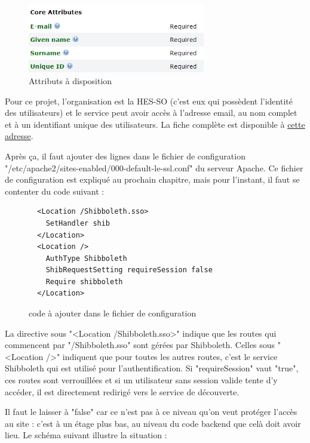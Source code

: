 \documentclass[
    iai, %
    eai, %
]{heig-tb}
\begin{document}
\begin{figure}[h]
  \centering
  \includegraphics[height=3cm]{registry2.PNG}
  \caption{Attributs à disposition}
\end{figure}

Pour ce projet, l'organisation est la HES-SO (c'est eux qui possèdent l'identité des utilisateurs) et le service peut avoir accès à l'adresse email, au nom complet et à un identifiant unique des utilisateurs. La fiche complète est disponible à \href{https://rr.aai.switch.ch/view_resource.php?resource=11600}{cette adresse}.

Après ça, il faut ajouter des lignes dans le fichier de configuration "/etc/apache2/sites-enabled/000-default-le-ssl.conf" du serveur Apache. Ce fichier de configuration est expliqué au prochain chapitre, mais pour l'instant, il faut se contenter du code suivant :

\begin{figure}[h]
  \begin{verbatim}
  <Location /Shibboleth.sso>
    SetHandler shib
  </Location>
  <Location />
    AuthType Shibboleth
    ShibRequestSetting requireSession false
    Require shibboleth
  </Location>
  \end{verbatim}
  \caption{code à ajouter dans le fichier de configuration}
  \label{code:Location}
\end{figure}

\newpage
La directive sous "<Location /Shibboleth.sso>" indique que les routes qui commencent par "/Shibboleth.sso" sont gérées par Shibboleth.
Celles sous "<Location />" indiquent que pour toutes les autres routes, c'est le service Shibboleth qui est utilisé pour l'authentification. Si "requireSession" vaut "true", ces routes sont verrouillées et si un utilisateur sans session valide tente d'y accéder, il est directement redirigé vers le service de découverte.

Il faut le laisser à "false" car ce n'est pas à ce niveau qu'on veut protéger l'accès au site : c'est à un étage plus bas, au niveau du code backend que celà doit avoir lieu.
Le schéma suivant illustre la situation :

\end{document}
